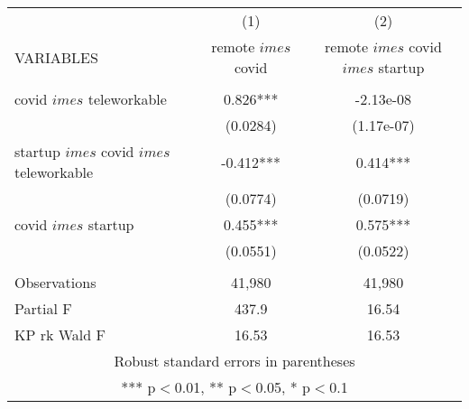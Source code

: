 \begin{tabular}{lcc} \hline
 & (1) & (2) \\
VARIABLES & remote $	imes$ covid & remote $	imes$ covid $	imes$ startup \\ \hline
 &  &  \\
covid $	imes$ teleworkable & 0.826*** & -2.13e-08 \\
 & (0.0284) & (1.17e-07) \\
startup $	imes$ covid $	imes$ teleworkable & -0.412*** & 0.414*** \\
 & (0.0774) & (0.0719) \\
covid $	imes$ startup & 0.455*** & 0.575*** \\
 & (0.0551) & (0.0522) \\
 &  &  \\
Observations & 41,980 & 41,980 \\
Partial F & 437.9 & 16.54 \\
 KP rk Wald F & 16.53 & 16.53 \\ \hline
\multicolumn{3}{c}{ Robust standard errors in parentheses} \\
\multicolumn{3}{c}{ *** p$<$0.01, ** p$<$0.05, * p$<$0.1} \\
\end{tabular}
